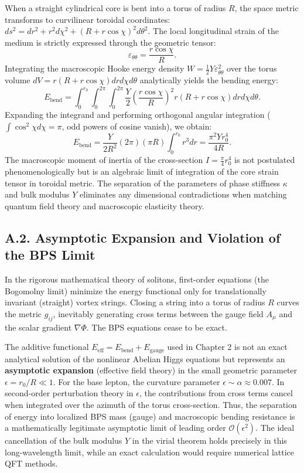 \documentclass[11pt,a4paper]{article}
\begin{document}
When a straight cylindrical core is bent into a torus of radius $R$, the space metric transforms to curvilinear toroidal coordinates: $ds^2 = dr^2 + r^2 d\chi^2 + (R + r\cos\chi)^2 d\theta^2$.
The local longitudinal strain of the medium is strictly expressed through the geometric tensor:
\begin{equation}
\varepsilon_{\theta\theta} = \frac{r \cos\chi}{R}.
\end{equation}
Integrating the macroscopic Hooke energy density $W = \frac{1}{2} Y \varepsilon_{\theta\theta}^2$ over the torus volume $dV = r(R + r\cos\chi) dr d\chi d\theta$ analytically yields the bending energy:
\begin{equation}
E_{\text{bend}} = \int_0^{r_0} \int_0^{2\pi} \int_0^{2\pi} \frac{Y}{2} \left( \frac{r \cos\chi}{R} \right)^2 r(R + r\cos\chi) dr d\chi d\theta.
\end{equation}
Expanding the integrand and performing orthogonal angular integration ($\int \cos^2\chi d\chi = \pi$, odd powers of cosine vanish), we obtain:
\begin{equation}
E_{\text{bend}} = \frac{Y}{2 R^2} (2\pi) (\pi R) \int_0^{r_0} r^3 dr = \frac{\pi^2 Y r_0^4}{4 R}.
\end{equation}
The macroscopic moment of inertia of the cross-section $I = \frac{\pi}{4} r_0^4$ is not postulated phenomenologically but is an algebraic limit of integration of the core strain tensor in toroidal metric. The separation of the parameters of phase stiffness $\kappa$ and bulk modulus $Y$ eliminates any dimensional contradictions when matching quantum field theory and macroscopic elasticity theory.

\subsection*{A.2. Asymptotic Expansion and Violation of the BPS Limit}
In the rigorous mathematical theory of solitons, first-order equations (the Bogomolny limit) minimize the energy functional only for translationally invariant (straight) vortex strings. Closing a string into a torus of radius $R$ curves the metric $g_{ij}$, inevitably generating cross terms between the gauge field $A_\mu$ and the scalar gradient $\nabla \Phi$. The BPS equations cease to be exact.

The additive functional $E_{\text{eff}} = E_{\text{bend}} + E_{\text{gauge}}$ used in Chapter 2 is not an exact analytical solution of the nonlinear Abelian Higgs equations but represents an \textbf{asymptotic expansion} (effective field theory) in the small geometric parameter $\epsilon = r_0 / R \ll 1$.
For the base lepton, the curvature parameter $\epsilon \sim \alpha \approx 0.007$. In second-order perturbation theory in $\epsilon$, the contributions from cross terms cancel when integrated over the azimuth of the torus cross-section. Thus, the separation of energy into localized BPS mass (gauge) and macroscopic bending resistance is a mathematically legitimate asymptotic limit of leading order $\mathcal{O}(\epsilon^2)$. The ideal cancellation of the bulk modulus $Y$ in the virial theorem holds precisely in this long-wavelength limit, while an exact calculation would require numerical lattice QFT methods.
\end{document}
